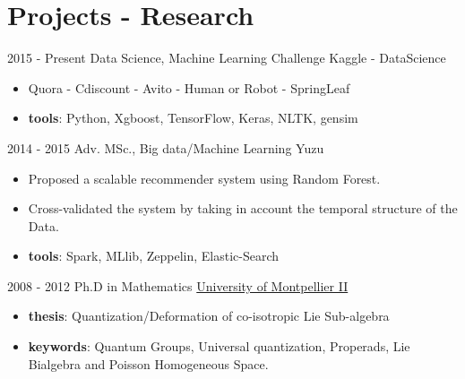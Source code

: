 \documentclass[letterpaper]{twentysecondcv} %
\begin{document}
\section{Projects - Research}{\faClipboard}
\begin{twenty}
	\twentyitem
			{2015 - }
			{Present}
			{Data Science, Machine Learning Challenge}
			{Kaggle - DataScience}
			{}
			{\begin{itemize}
			 \item Quora - Cdiscount - Avito - Human or Robot - SpringLeaf
			 \item \textbf{tools}: Python, Xgboost, TensorFlow, Keras, NLTK, gensim
			\end{itemize}}
	\twentyitem
    	{2014 - 2015}
		{}
        {Adv. MSc., Big data/Machine Learning}
        {Yuzu}
        {}
        {\begin{itemize}
        \item Proposed a scalable recommender system using Random Forest.
        \item Cross-validated the system by taking in account the temporal structure of the Data.
        \item \textbf{tools}: Spark, MLlib, Zeppelin, Elastic-Search
		\end{itemize}}
	\twentyitem
			{2008 - 2012}
			{}
			{Ph.D in Mathematics}
			{\href{http://www.umontpellier.fr/}{University of Montpellier II}}
			{}
			{\begin{itemize}
			\item \textbf{thesis}: Quantization/Deformation of co-isotropic Lie Sub-algebra
			\item \textbf{keywords}: Quantum Groups, Universal quantization, Properads, Lie Bialgebra and Poisson Homogeneous Space.
			\end{itemize}}
\end{twenty}
\end{document}
